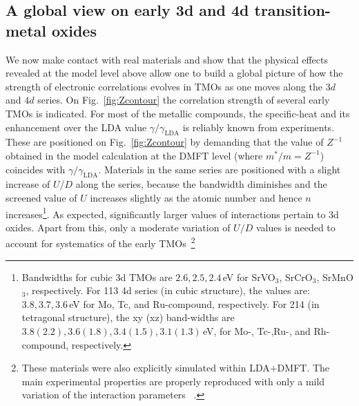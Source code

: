 \documentclass[]{ar2e-changed}%
\begin{document}
\subsection{A global view on early 3d and 4d transition-metal oxides}
\label{sec:oxides_globalview}

We now make contact with real materials and show that the physical effects revealed 
at the model level above  allow one to build a global picture of how the strength 
of electronic correlations evolves in TMOs as one moves along the $3d$ and $4d$ series. 
%
On Fig.~\ref{fig:Zcontour} the correlation strength of several early TMOs 
is indicated. 
%
For most of the metallic compounds, the specific-heat and its
enhancement over the LDA value $\gamma/\gamma_\mathrm{LDA}$ is
reliably known from experiments.  
%
These are positioned on Fig.~\ref{fig:Zcontour} by demanding that the value 
of $Z^{-1}$ obtained in the model calculation at the DMFT level (where $m^*/m=Z^{-1}$)  
coincides with $\gamma/\gamma_\mathrm{LDA}$.  
%
Materials in the same series are positioned with a slight increase of $U/D$ along the series, 
because the bandwidth diminishes and the screened value of $U$ increases slightly as the atomic number 
and hence $n$ increases\footnote{Bandwidths for cubic 3d
  TMOs are $2.6,2.5,2.4$\,eV for SrVO$_3$, SrCrO$_3$, SrMnO$_3$,
  respectively. For 113 4d series (in cubic structure), the values
  are: $3.8,3.7,3.6$\,eV for Mo, Tc, and Ru-compound,
  respectively. For 214 (in tetragonal structure), the xy (xz)
  band-widths are $3.8 (2.2), 3.6 (1.8), 3.4 (1.5),3.1 (1.3)$\,eV, for
  Mo-, Tc-,Ru-, and Rh-compound, respectively. 
}.  
%  
As expected, significantly larger values of interactions pertain to 3d oxides.
Apart from this, only a moderate variation of $U/D$ values is needed
to account for systematics of the early TMOs~\footnote{These materials were also explicitly simulated within LDA+DMFT. 
The main experimental properties are properly reproduced with only a mild variation of the interaction parameters
~\cite{mravlje11,demedici_prl_2011,mravlje_SrTcO3_prl_2011}.} 
  
\end{document}
